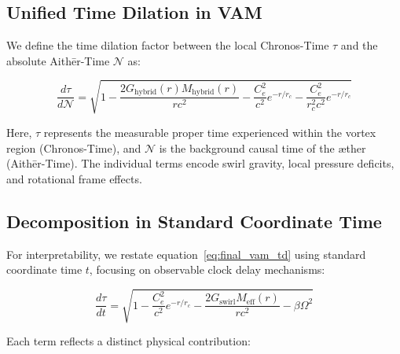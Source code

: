 \subsection{Unified Time Dilation in VAM}

We define the time dilation factor between the local Chronos-Time \( \tau \) and the absolute Aithēr-Time \( \mathcal{N} \) as:

\begin{equation}
    \boxed{
        \frac{d\tau}{d\mathcal{N}} = \sqrt{
            1
            - \frac{2 G_{\text{hybrid}}(r) M_{\text{hybrid}}(r)}{r c^2}
            - \frac{C_e^2}{c^2} e^{-r/r_c}
            - \frac{C_e^2}{r_c^2 c^2} e^{-r/r_c}
        }}
    \label{eq:final_vam_td}
\end{equation}

Here, \( \tau \) represents the measurable proper time experienced within the vortex region (Chronos-Time), and \( \mathcal{N} \) is the background causal time of the æther (Aithēr-Time). The individual terms encode swirl gravity, local pressure deficits, and rotational frame effects.

\subsection{Decomposition in Standard Coordinate Time}

For interpretability, we restate equation~\eqref{eq:final_vam_td} using standard coordinate time \( t \), focusing on observable clock delay mechanisms:

\begin{equation}
    \frac{d\tau}{dt} = \sqrt{
        1
        - \frac{C_e^2}{c^2} e^{-r/r_c}
        - \frac{2 G_\text{swirl} M_\text{eff}(r)}{r c^2}
        - \beta \Omega^2
    }
\end{equation}

Each term reflects a distinct physical contribution:

